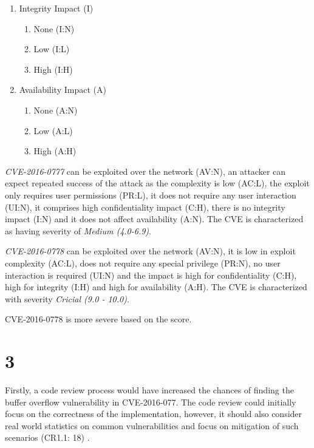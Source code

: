 \documentclass[a4paper, 12pt]{article}
\begin{document}
\begin{multicols}{2}
\begin{enumerate}
      \item Integrity Impact (I)
          \begin{enumerate}
              \item None (I:N)
              \item Low (I:L)
              \item High (I:H)
          \end{enumerate}

      \item Availability Impact (A)
          \begin{enumerate}
              \item None (A:N)
              \item Low (A:L)
              \item High (A:H)
          \end{enumerate}
  \end{enumerate}
\end{multicols}

\textit{CVE-2016-0777} can be exploited over the network (AV:N), an attacker can expect repeated success of the attack as the complexity is low (AC:L), the exploit only requires user permissions (PR:L), it does not require any user interaction (UI:N), it comprises high confidentiality impact (C:H), there is no integrity impact (I:N) and it does not affect availability (A:N). The CVE is characterized as having severity of \textit{Medium (4.0-6.9)}.

\textit{CVE-2016-0778} can be exploited over the network (AV:N), it is low in exploit complexity (AC:L), does not require any special privilege (PR:N), no user interaction is required (UI:N) and the impact is high for confidentiality (C:H), high for integrity (I:H) and high for availability (A:H). The CVE is characterized with severity \textit{Cricial (9.0 - 10.0)}. 

CVE-2016-0778 is more severe based on the score.

\setcounter{section}{2}
\section*{3}
Firstly, a code review process would have increased the chances of finding the buffer overflow vulnerability in CVE-2016-077. The code review could initially focus on the correctness of the implementation, however, it should also consider real world statistics on common vulnerabilities and focus on mitigation of such scenarios (CR1.1: 18) \cite{BSIMM6-CodeReview}.
\end{document}
